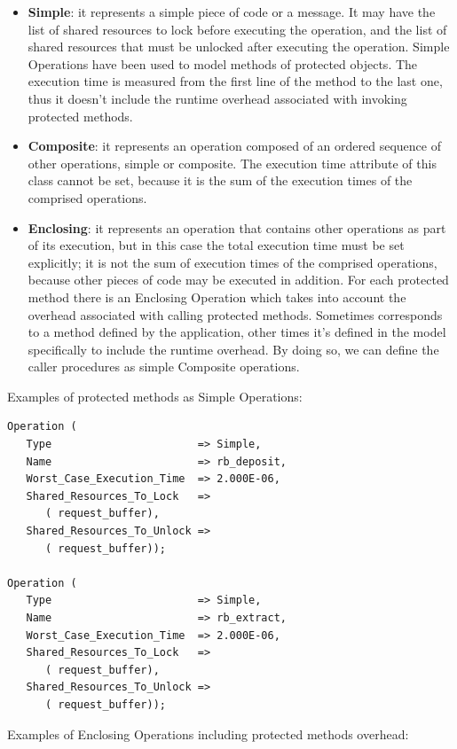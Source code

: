 \documentclass{article}
\begin{document}
\begin{itemize}
   \item \textbf{Simple}: it represents a simple piece of code or a message. It may have the list of shared resources to lock before executing the operation, and the list of shared resources that must be unlocked after executing the operation. Simple Operations have been used to model methods of protected objects. The execution time is measured from the first line of the method to the last one, thus it doesn't include the runtime overhead associated with invoking protected methods.
   \item \textbf{Composite}: it represents an operation composed of an ordered sequence of other operations, simple or composite. The execution time attribute of this class cannot be set, because it is the sum of the execution times of the comprised operations.
   \item \textbf{Enclosing}: it represents an operation that contains other operations as part of its execution, but in this case the total execution time must be set explicitly; it is not the sum of execution times of the comprised operations, because other pieces of code may be executed in addition. For each protected method there is an Enclosing Operation which takes into account the overhead associated with calling protected methods. Sometimes corresponds to a method defined by the application, other times it's defined in the model specifically to include the runtime overhead. By doing so, we can define the caller procedures as simple Composite operations.
\end{itemize}

Examples of protected methods as Simple Operations:

\begin{lstlisting}
Operation (
   Type                       => Simple,
   Name                       => rb_deposit,
   Worst_Case_Execution_Time  => 2.000E-06,
   Shared_Resources_To_Lock   =>
      ( request_buffer),
   Shared_Resources_To_Unlock =>
      ( request_buffer));

Operation (
   Type                       => Simple,
   Name                       => rb_extract,
   Worst_Case_Execution_Time  => 2.000E-06,
   Shared_Resources_To_Lock   =>
      ( request_buffer),
   Shared_Resources_To_Unlock =>
      ( request_buffer));
\end{lstlisting}

Examples of Enclosing Operations including protected methods overhead:
\end{document}
